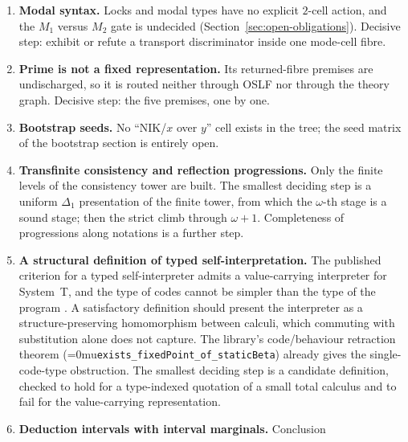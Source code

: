 \documentclass[11pt]{article}
\newcommand{\leanname}[1]{\textup{\Urlmuskip=0mu\relax\nolinkurl{#1}}}
\theoremstyle{definition}
\theoremstyle{remark}
\begin{document}
\begin{enumerate}
  the relevant umbrella now rebuilds against the current Lean executor.
  Its older mode-dispatch cover is only a mode projection. These constructions
  retain canonical-entry admission, explicit handlers and selected execution
  strategies. The remaining C-facing qualification and the strongest
  justified extension beyond admitted states must not be inferred from a
  generated program or from the mode-dispatch table. They belong to the
  lowering lane, not to selection of Prime's logical foundation.
\item \textbf{Modal syntax.}  Locks and modal types have no explicit
  $2$-cell action, and the $M_1$ versus $M_2$ gate is undecided
  (Section~\ref{sec:open-obligations}).  Decisive step: exhibit or refute a
  transport discriminator inside one mode-cell fibre.
\item \textbf{Prime is not a fixed representation.}  Its returned-fibre
  premises are undischarged, so it is routed neither through OSLF nor
  through the theory graph.  Decisive step: the five premises, one by one.
\item \textbf{Bootstrap seeds.}  No ``NIK/$x$ over $y$'' cell exists in the
  tree; the seed matrix of the bootstrap section is entirely open.
\item \textbf{Transfinite consistency and reflection progressions.}  Only the
  finite levels of the consistency tower are built.  The smallest deciding step
  is a uniform $\Delta_1$ presentation of the finite tower, from which the
  $\omega$-th stage is a sound stage; then the strict climb through
  $\omega+1$.  Completeness of progressions along notations is a further step.
\item \textbf{A structural definition of typed self-interpretation.}  The
  published criterion for a typed self-interpreter admits a value-carrying
  interpreter for System~T, and the type of codes cannot be simpler than the
  type of the program \cite{BauerSelfInterpreterT}.  A satisfactory definition
  should present the interpreter as a structure-preserving homomorphism between
  calculi, which commuting with substitution alone does not capture.  The
  library's code/behaviour retraction theorem
  (\leanname{exists_fixedPoint_of_staticBeta}) already gives the single-code-type
  obstruction.  The smallest deciding step is a candidate definition, checked to
  hold for a type-indexed quotation of a small total calculus and to fail for the
  value-carrying representation.
\item \textbf{Deduction intervals with interval marginals.}  Conclusion

\end{enumerate}
\end{document}
